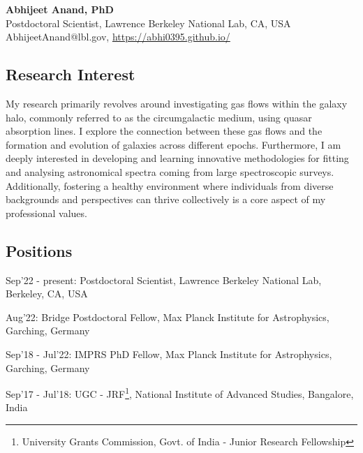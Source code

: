 \documentclass[12pt,letterpaper]{article}
\begin{document}
\thispagestyle{empty}\sloppy\sloppypar\raggedbottom

\textbf{\Large Abhijeet Anand, PhD}\\[0.5ex]
Postdoctoral Scientist, Lawrence Berkeley National Lab, CA, USA\\[0.5ex]
\textsf{\small AbhijeetAnand@lbl.gov, \href{https://abhi0395.github.io/}{https://abhi0395.github.io/}}\\[0.5ex]

\subsection{Research Interest}
My research primarily revolves around investigating gas flows within the galaxy halo, commonly referred to as the circumgalactic medium, using quasar absorption lines. I explore the connection between these gas flows and the formation and evolution of galaxies across different epochs. Furthermore, I am deeply interested in developing and learning innovative methodologies for fitting and analysing astronomical spectra coming from large spectroscopic surveys. Additionally, fostering a healthy environment where individuals from diverse backgrounds and perspectives can thrive collectively is a core aspect of my professional values.

\subsection{Positions}
\begin{list}{}{\cvlist}
\item Sep'22 - present: Postdoctoral Scientist, Lawrence Berkeley National Lab, Berkeley, CA, USA \\
\item Aug'22: Bridge Postdoctoral Fellow, Max Planck Institute for Astrophysics, Garching, Germany
\item Sep'18 - Jul'22: IMPRS PhD Fellow, Max Planck Institute for Astrophysics, Garching, Germany
\item Sep'17 - Jul'18: UGC - JRF\footnote{University Grants Commission, Govt. of India - Junior Research Fellowship}, National Institute of Advanced Studies, Bangalore, India 
\end{list}
\end{document}
